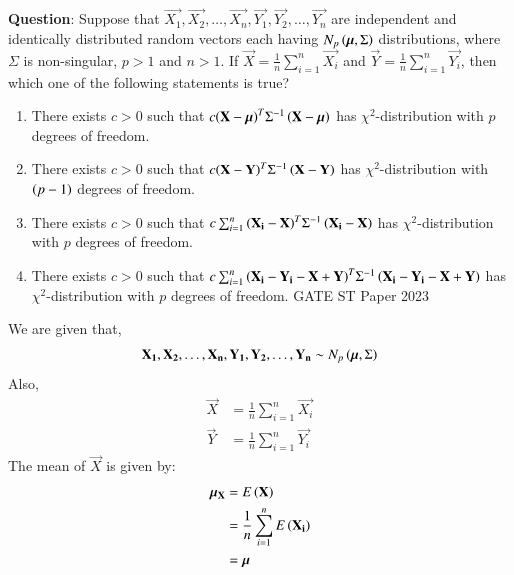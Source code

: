 \documentclass[journal,12pt,onecolumn]{IEEEtran}
\theoremstyle{remark}
\begin{document}
%
\textbf{Question}:
Suppose that $\vec{X_1}, \vec{X_2},\ldots, \vec{X_n}, \vec{Y_1}, \vec{Y_2},\ldots, \vec{Y_n}$ are independent and identically distributed random vectors each having $N_p\left(\bm{\mu},\Sigma\right)$ distributions, where $\Sigma$ is non-singular, $p>1$ and $n>1$. If $\vec{X} = \frac{1}{n}\sum_{i=1}^{n}\vec{X_i}$ and $\vec{Y} = \frac{1}{n}\sum_{i=1}^{n}\vec{Y_i}$, then which one of the following statements is true?
\begin{enumerate}[label=(\alph*)]
\item There exists $c>0$ such that $c{\left(\mathbf{X}-\bm{\mu}\right)}^T{\Sigma}^{-1}\left(\mathbf{X}-\bm{\mu}\right)$ has ${\chi}^2$-distribution with $p$ degrees of freedom.
\item There exists $c>0$ such that $c{\left(\mathbf{X}-\mathbf{Y}\right)^T}{\Sigma}^{-1}\left(\mathbf{X}-\mathbf{Y}\right)$ has ${\chi}^2$-distribution with $\left(p-1\right)$ degrees of freedom.
\item There exists $c>0$ such that $c\sum_{i=1}^n{\left(\mathbf{X_i}-\mathbf{X}\right)}^T{\Sigma}^{-1}\left(\mathbf{X_i}-\mathbf{X}\right)$ has ${\chi}^2$-distribution with $p$ degrees of freedom.
\item There exists $c>0$ such that $c\sum_{i=1}^n{\left(\mathbf{X_i}-\mathbf{Y_i}-\mathbf{X}+\mathbf{Y}\right)}^T{\Sigma}^{-1}\left(\mathbf{X_i}-\mathbf{Y_i}-\mathbf{X}+\mathbf{Y}\right)$ has ${\chi}^2$-distribution with $p$ degrees of freedom.   \hfill{GATE ST Paper 2023} 
\end{enumerate}    
\solution
\newline
We are given that,
\begin{align}
\mathbf{X_1}, \mathbf{X_2},\ldots, \mathbf{X_n}, \mathbf{Y_1}, \mathbf{Y_2},\ldots, \mathbf{Y_n} \sim N_p\left(\bm{\mu},\Sigma\right)
\end{align}
Also,
\begin{align}
\vec{X} &= \frac{1}{n}\sum_{i=1}^{n}\vec{X_i} \\
\vec{Y} &= \frac{1}{n}\sum_{i=1}^{n}\vec{Y_i} 
\end{align}
The mean of $\vec{X}$ is given by: 
\begin{align}
{\bm{\mu}}_{\mathbf{X}} &= E\left(\mathbf{X}\right) \\
                                    &= \frac{1}{n}\sum_{i=1}^{n}E\left(\mathbf{X_i}\right) \\
                                    &= \bm{\mu}  \label{eq:23/25/1}
\end{align}
\end{document}

